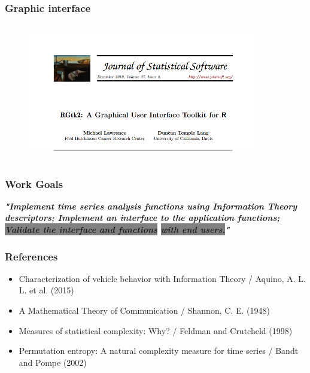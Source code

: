 \documentclass[10pt, compress]{beamer}
\begin{document}
\begin{frame}[fragile]
\frametitle{Graphic interface}
\begin{figure}
  \centering
   \includegraphics[width=10cm,height=6cm]{rgtk2.png}
\end{figure}
\end{frame}

\begin{frame}[fragile]
\frametitle{Work Goals}
\begin{sloppypar}
\textit{\textbf{\Large "Implement time series analysis functions using Information Theory descriptors; Implement an interface to the application functions; \colorbox{gray}{Validate the interface and functions} \colorbox{gray}{with end users.}"}}
\end{sloppypar}
\end{frame}

\begin{frame}[fragile]
  \frametitle{References}
\begin{itemize}

\item{Characterization of vehicle behavior with Information Theory / Aquino, A. L. L. et al. (2015)}

\item{A Mathematical Theory of Communication / Shannon, C. E. (1948)}

\item{Measures of statistical complexity: Why? / Feldman and Crutcheld (1998)}

\item{Permutation entropy: A natural complexity measure for time series / Bandt and Pompe (2002)}

\end{itemize}
\end{frame}

\end{document}
